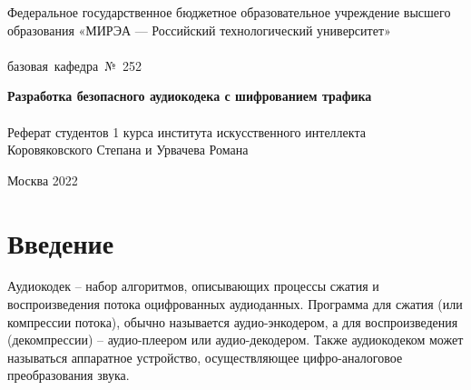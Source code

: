 \documentclass[a4paper]{report}
\begin{document}
\begin{titlepage}
\newpage



\begin{center}
\vfill

Федеральное государственное бюджетное образовательное учреждение высшего образования «МИРЭА — Российский технологический университет»\\
\ \\

\hfill\vbox
{
\hbox{базовая кафедра № 252}
}

\vfill

{\large\bf Разработка безопасного аудиокодека с шифрованием трафика\\}
\ \\
Реферат студентов 1 курса института искусственного интеллекта\\
Коровяковского Степана и Урвачева Романа

\vfill

\vfill

Москва 2022
\end{center}

\end{titlepage}
\tableofcontents


\newpage
\chapter*{Введение}
Аудиокодек – набор алгоритмов, описывающих процессы сжатия и воспроизведения потока оцифрованных аудиоданных. Программа для сжатия (или компрессии потока), обычно называется аудио-энкодером, а для воспроизведения (декомпрессии) – аудио-плеером или аудио-декодером. Также аудиокодеком может называться аппаратное устройство, осуществляющее цифро-аналоговое преобразования звука.
\end{document}
